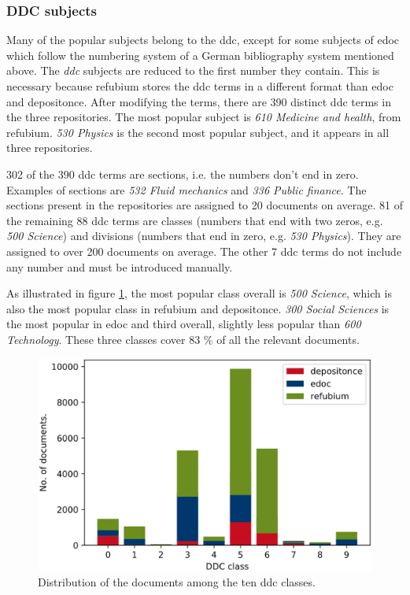 \subsubsection{DDC subjects} \label{subjects_ddc}

Many of the popular subjects belong to the \acrshort{ddc}, except for some subjects of edoc which follow the numbering system of a German bibliography system mentioned above. The \textit{ddc} subjects are reduced to the first number they contain. This is necessary because refubium stores the \acrshort{ddc} terms in a different format than edoc and depositonce. After modifying the terms, there are 390 distinct \acrshort{ddc} terms in the three repositories. The most popular subject is \textit{610 Medicine and health}, from refubium. \textit{530 Physics} is the second most popular subject, and it appears in all three repositories.  

302 of the 390 \acrshort{ddc} terms are sections, i.e. the numbers don't end in zero. Examples of sections are \textit{532 Fluid mechanics} and \textit{336 Public finance}. The sections present in the repositories are assigned to 20 documents on average. 81 of the remaining 88 \acrshort{ddc} terms are classes (numbers that end with two zeros, e.g. \textit{500 Science}) and divisions (numbers that end in zero, e.g. \textit{530 Physics}). They are assigned to over 200 documents on average. The other 7 \acrshort{ddc} terms do not include any number and must be introduced manually.

As illustrated in figure \ref{fig:ddc_distribution}, the most popular class overall is \textit{500 Science}, which is also the most popular class in refubium and depositonce. \textit{300 Social Sciences} is the most popular in edoc and third overall, slightly less popular than \textit{600 Technology}. These three classes cover 83 \% of all the relevant documents.

\begin{figure}
    \centering
    \includegraphics[width=.8\textwidth]{figures/repository_analysis/ddc_distribution.PNG}
    \caption{Distribution of the documents among the ten \acrshort{ddc} classes.}
    \label{fig:ddc_distribution}
\end{figure}

